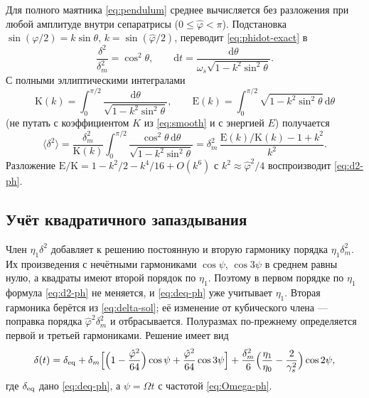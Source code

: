 Для полного маятника \eqref{eq:pendulum} среднее вычисляется без разложения при любой амплитуде внутри сепаратрисы ($0\le\hat\varphi<\pi$). Подстановка $\sin(\varphi/2)=k\sin\theta$, $k=\sin(\hat\varphi/2)$, переводит \eqref{eq:phidot-exact} в
\begin{equation*}
\frac{\delta^2}{\delta_m^2}=\cos^2\theta,
\qquad
\mathrm{d}t=\frac{\mathrm{d}\theta}{\omega_s\sqrt{1-k^2\sin^2\theta}}.
\end{equation*}
С полными эллиптическими интегралами
\begin{equation}
\label{eq:ell-def}
\mathrm{K}(k)
=\int_0^{\pi/2}\frac{\mathrm{d}\theta}{\sqrt{1-k^2\sin^2\theta}},
\qquad
\mathrm{E}(k)
=\int_0^{\pi/2}\sqrt{1-k^2\sin^2\theta}\,\mathrm{d}\theta
\end{equation}
(не путать с коэффициентом $K$ из \eqref{eq:smooth} и с энергией $E$) получается
\begin{equation}
\label{eq:d2-ell}
\langle\delta^2\rangle
=\frac{\delta_m^2}{\mathrm{K}(k)}
\int_0^{\pi/2}
\frac{\cos^2\theta\,\mathrm{d}\theta}{\sqrt{1-k^2\sin^2\theta}}
=\delta_m^2\,
\frac{\mathrm{E}(k)/\mathrm{K}(k)-1+k^2}{k^2}.
\end{equation}
Разложение $\mathrm{E}/\mathrm{K}=1-k^2/2-k^4/16+O(k^6)$ с $k^2\approx\hat\varphi^2/4$ воспроизводит \eqref{eq:d2-ph}.

\subsection{Учёт квадратичного запаздывания}

Член $\eta_1\delta^2$ добавляет к решению постоянную и вторую гармонику порядка $\eta_1\delta_m^2$. Их произведения с нечётными гармониками $\cos\psi$, $\cos3\psi$ в среднем равны нулю, а квадраты имеют второй порядок по $\eta_1$. Поэтому в первом порядке по $\eta_1$ формула \eqref{eq:d2-ph} не меняется, и \eqref{eq:deq-ph} уже учитывает $\eta_1$. Вторая гармоника берётся из \eqref{eq:delta-sol}; её изменение от кубического члена --- поправка порядка $\hat\varphi^2\delta_m^2$ и отбрасывается. Полуразмах по-прежнему определяется первой и третьей гармониками. Решение имеет вид
\begin{equation}
\label{eq:delta-ph-eta}
\delta(t)
=\delta_{\mathrm{eq}}
+\delta_m\Bigl[
\Bigl(1-\frac{\hat\varphi^2}{64}\Bigr)\cos\psi
+\frac{\hat\varphi^2}{64}\cos 3\psi
\Bigr]
+\frac{\delta_m^2}{6}
\Bigl(\frac{\eta_1}{\eta_0}-\frac{2}{\gamma_s^2}\Bigr)\cos 2\psi,
\end{equation}
где $\delta_{\mathrm{eq}}$ дано \eqref{eq:deq-ph}, а $\psi=\Omega t$ с частотой \eqref{eq:Omega-ph}.


